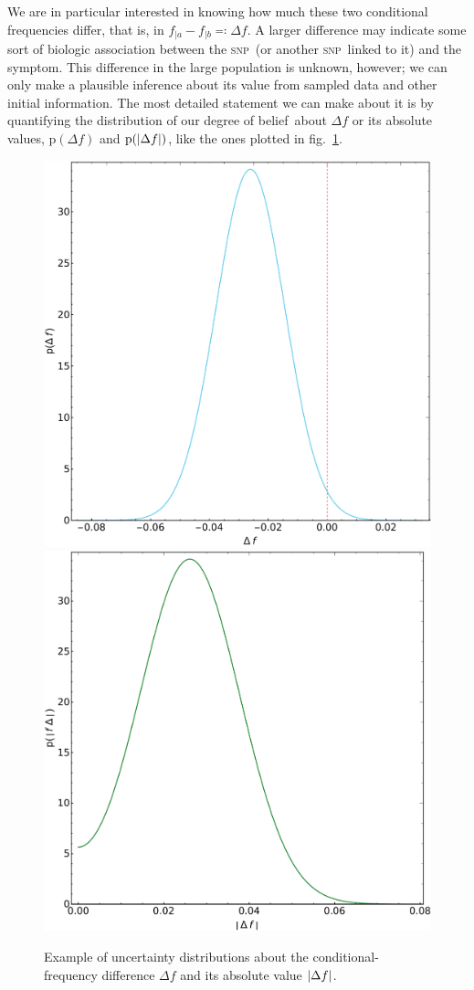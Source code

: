 \documentclass[\ifafour a4paper,12pt,\else a5paper,10pt,\fi%
onecolumn,oneside,article,%
british%
]{memoir}
\theoremstyle{remark}
\theoremstyle{innote}
\newcommand*{\defs}{\eqqcolon}
\DeclarePairedDelimiter\abs{\lvert}{\rvert}
\newcommand*{\pf}{\mathrm{p}}%
\renewcommand*{\|}[1][]{\nonscript\,#1\vert\nonscript\;\mathopen{}}
\newcommand*{\fig}{fig.}%
\newcommand*{\dob}{degree of belief}
\newcommand*{\snp}{\textsc{snp}}
\newcommand*{\ya}{a}
\newcommand*{\yb}{b}
\newcommand*{\df}{\Delta f}
\begin{document}
We are in particular interested in knowing how much these two conditional
frequencies differ, that is, in $f_{|\ya}-f_{|\yb} \defs \df$. A larger
difference may indicate some sort of biologic association between the \snp\
(or another \snp\ linked to it) and the symptom. This difference in the
large population is unknown, however; we can only make a plausible
inference about its value from sampled data and other initial information.
The most detailed statement we can make about it is by quantifying the
distribution of our \dob\ about $\df$ or its absolute values, $\pf(\df)$
and $\pf(\abs{\df})$, like the ones plotted in
\fig~\ref{fig:example_difference_distributions}.
\begin{figure}[t!]%
 \centering\includegraphics[width=0.49\linewidth]{example_diff.pdf}\includegraphics[width=0.49\linewidth]{example_absdiff.pdf}\\
 \caption{Example of uncertainty distributions about the
   conditional-frequency difference $\df$ and its absolute value
   $\abs{\df}$.}\label{fig:example_difference_distributions}
\end{figure}%
\end{document}
